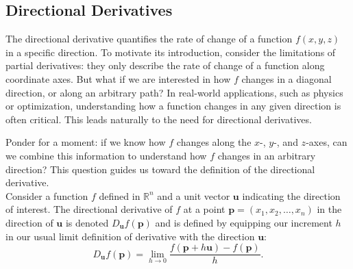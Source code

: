 \subsection*{Directional Derivatives} 

\noindent The directional derivative quantifies the rate of change of a function \( f(x, y, z) \) in a specific direction. To motivate its introduction, consider the limitations of partial derivatives: they only describe the rate of change of a function along coordinate axes. But what if we are interested in how \( f \) changes in a diagonal direction, or along an arbitrary path? In real-world applications, such as physics or optimization, understanding how a function changes in any given direction is often critical. This leads naturally to the need for directional derivatives.

\noindent Ponder for a moment: if we know how \( f \) changes along the \( x \)-, \( y \)-, and \( z \)-axes, can we combine this information to understand how \( f \) changes in an arbitrary direction? This question guides us toward the definition of the directional derivative. \\

\noindent Consider a function \( f \) defined in \( \mathbb{R}^n \) and a unit vector \( \mathbf{u} \) indicating the direction of interest. The directional derivative of \( f \) at a point \( \mathbf{p} = (x_1, x_2, \ldots, x_n) \) in the direction of \( \mathbf{u} \) is denoted \( D_{\mathbf{u}} f(\mathbf{p}) \) and is defined by equipping our increment $h$ in our usual limit definition of derivative with the direction $\mathbf{u}$:
\[
D_{\mathbf{u}} f(\mathbf{p}) = \lim_{h \to 0} \frac{f(\mathbf{p} + h \mathbf{u}) - f(\mathbf{p})}{h}.
\]


